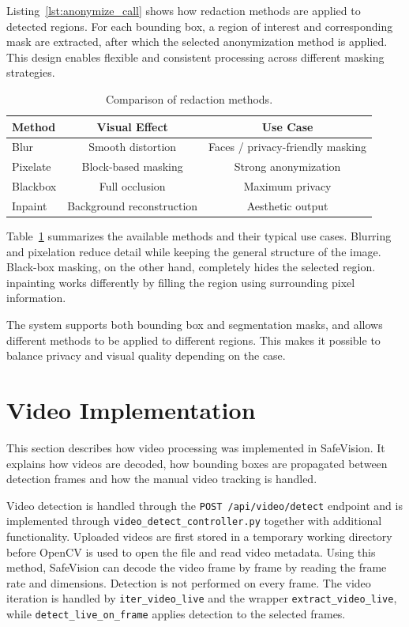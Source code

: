 Listing~\ref{lst:anonymize_call} shows how redaction methods are applied to detected regions. For each \gls{bounding box}, a region of interest and corresponding mask are extracted, after which the selected \gls{anonymization} method is applied. This design enables flexible and consistent processing across different \gls{masking} strategies.

\begin{table}[H]
\centering
\begin{tabular}{lcc}
\hline
\textbf{Method} & \textbf{Visual Effect} & \textbf{Use Case} \\
\hline
Blur & Smooth distortion & Faces / privacy-friendly \gls{masking} \\
Pixelate & Block-based \gls{masking} & Strong \gls{anonymization} \\
Blackbox & Full occlusion & Maximum privacy \\
Inpaint & Background reconstruction & Aesthetic output \\
\hline
\end{tabular}
\caption{Comparison of redaction methods.}
\label{tab:redaction_methods}
\end{table}

Table~\ref{tab:redaction_methods} summarizes the available methods and their typical use cases. Blurring and pixelation reduce detail while keeping the general structure of the image. Black-box \gls{masking}, on the other hand, completely hides the selected region. \Gls{inpainting} works differently by filling the region using surrounding pixel information.

The system supports both \gls{bounding box} and \gls{segmentation} masks, and allows different methods to be applied to different regions. This makes it possible to balance privacy and visual quality depending on the  case.



\section{Video Implementation}
\label{sec:video_imp}

This section describes how video processing was implemented in \gls{SafeVision}. It explains how videos are decoded, how \gls{bounding box}es are propagated between detection frames and how the manual video tracking is handled.


Video detection is handled through the \texttt{POST /api/video/detect} endpoint and is implemented through \texttt{video\_detect\_controller.py} together with additional functionality. Uploaded videos are first stored in a temporary working directory before OpenCV is used to open the file and read video metadata. Using this method, \gls{SafeVision} can decode the video frame by frame by reading the frame rate and dimensions. Detection is not performed on every frame. The video iteration is handled by \texttt{iter\_video\_live} and the wrapper \texttt{extract\_video\_live}, while \texttt{detect\_live\_on\_frame} applies detection to the selected frames.

